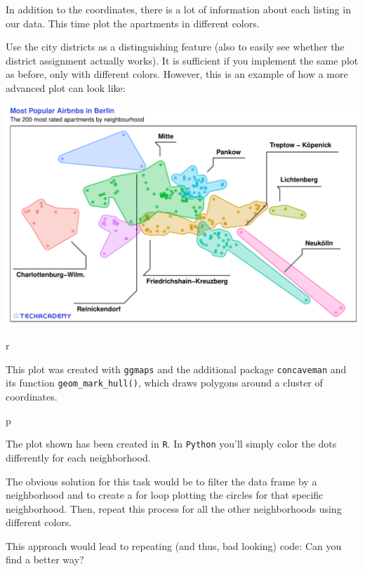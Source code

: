 \documentclass[
  11pt,
]{book}
\begin{document}
In addition to the coordinates, there is a lot of information about each
listing in our data. This time plot the apartments in different colors.

Use the city districts as a distinguishing feature (also to easily see
whether the district assignment actually works). It is sufficient if you
implement the same plot as before, only with different colors. However,
this is an example of how a more advanced plot can look like:

\begin{center}\includegraphics[width=1\linewidth]{plot/4_2_map_top200_by_neighbourhood} \end{center}

\begin{tips}r

This plot was created with \texttt{ggmaps} and the additional package
\texttt{concaveman} and its function \texttt{geom\_mark\_hull()}, which
draws polygons around a cluster of coordinates.

\end{tips}

\begin{tipsp}p

The plot shown has been created in \texttt{R}. In \texttt{Python} you'll
simply color the dots differently for each neighborhood.

The obvious solution for this task would be to filter the data frame by
a neighborhood and to create a for loop plotting the circles for that
specific neighborhood. Then, repeat this process for all the other
neighborhoods using different colors.

This approach would lead to repeating (and thus, bad looking) code: Can
you find a better way?

\end{tipsp}
\end{document}
